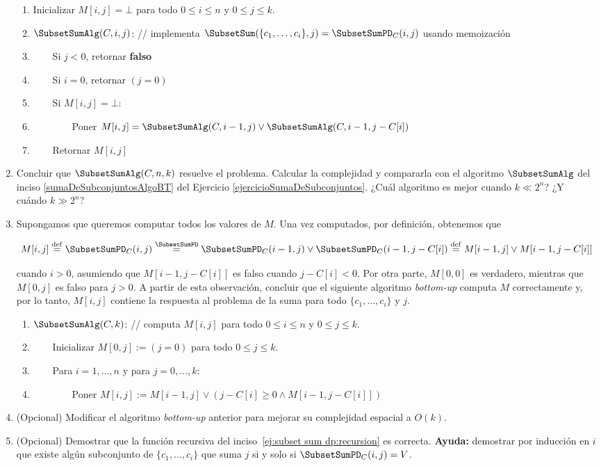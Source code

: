 \begin{enumerate}[label=$\alph*)$,ref=$\alph*)$]
  \begin{enumerate}
   \item Inicializar $M[i,j] = \bot$ para todo $0 \leq i \leq n$ y $0 \leq j \leq k$.
   \item $\SubsetSumAlg(C, i, j)$: // implementa $\SubsetSum(\{c_1, \ldots, c_i\}, j) = \SubsetSumPD_C(i,  j)$ usando memoización
   \item ~~~~Si $j < 0$, retornar \textbf{falso}
   \item ~~~~Si $i = 0$, retornar $(j = 0)$
   \item ~~~~Si $M[i, j] = \bot$:
   \item ~~~~~~~~Poner $M[i, j] = \SubsetSumAlg(C, i-1, j) \lor \SubsetSumAlg(C, i-1, j - C[i])$
   \item ~~~~Retornar $M[i, j]$
  \end{enumerate}

  \item Concluir que $\SubsetSumAlg(C, n, k)$ resuelve el problema.  Calcular la complejidad y compararla con el algoritmo $\SubsetSumAlg$ del inciso \ref{sumaDeSubconjuntosAlgoBT} del Ejercicio \ref{ejercicioSumaDeSubconjuntos}. ¿Cuál algoritmo es mejor cuando $k \ll 2^n$?  ¿Y cuándo $k \gg 2^n$?

  \item Supongamos que queremos computar todos los valores de $M$.  Una vez computados, por definición, obtenemos que

$$
   M[i,j] \stackrel{\rm def}{=} \SubsetSumPD_C(i, j) \stackrel{\SubsetSumPD}{=} \SubsetSumPD_C(i-1, j) \lor \SubsetSumPD_C(i-1, j-C[i]) \stackrel{\rm def}{=} M[i-1, j] \lor M[i-1, j-C[i]]
$$
  
  cuando $i > 0$, asumiendo que $M[i-1, j-C[i]]$ es falso cuando $j-C[i] < 0$.  Por otra parte, $M[0, 0]$ es verdadero, mientras que $M[0, j]$ es falso para $j > 0$.  A partir de esta observación, concluir que el siguiente algoritmo \emph{bottom-up} computa $M$ correctamente y, por lo tanto, $M[i, j]$ contiene la respuesta al problema de la suma para todo $\{c_1, \ldots, c_i\}$ y $j$.

  \begin{enumerate}
   \item $\SubsetSumAlg(C, k)$: // computa $M[i,j]$ para todo $0 \leq i \leq n$ y $0 \leq j \leq k$.
   \item ~~~~Inicializar $M[0,j] := (j = 0)$ para todo $0 \leq j \leq k$.
   \item ~~~~Para $i = 1, \ldots, n$ y para $j = 0, \ldots, k$:
   \item ~~~~~~~~Poner $M[i, j] := M[i-1, j] \lor (j-C[i] \geq 0 \land M[i-1, j-C[i]])$
  \end{enumerate}
  \item (Opcional) Modificar el algoritmo \textit{bottom-up} anterior para mejorar su complejidad espacial a $O(k)$.
  \item (Opcional) Demostrar que la función recursiva del inciso~\ref{ej:subset sum dp:recursion} es correcta.  \textbf{Ayuda:} demostrar por inducción en $i$ que existe algún subconjunto de $\{c_1, \ldots, c_i\}$ que suma $j$ si y solo si $\SubsetSumPD_C(i, j) = V$.
 \end{enumerate}


